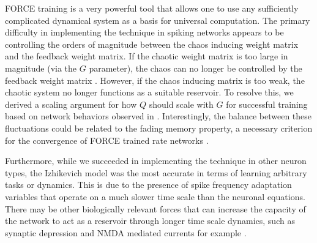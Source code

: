 \documentclass[11pt]{article} %
\begin{document}
%


FORCE training is a very powerful tool that allows one to use any sufficiently complicated dynamical system as a basis for universal computation.   The primary difficulty in implementing the technique in spiking networks appears to be controlling the orders of magnitude between the chaos inducing weight matrix and the feedback weight matrix.  If the chaotic weight matrix is too large in magnitude (via the $G$ parameter), the chaos can no longer be controlled by the feedback weight matrix \cite{FORCE1}.  However, if the chaos inducing matrix is too weak, the chaotic system no longer functions as a suitable reservoir.   To resolve this, we derived a scaling argument for how $Q$ should scale with $G$ for successful training based on network behaviors observed in \cite{FORCE1}.  Interestingly, the balance between these fluctuations could be related to the fading memory property, a necessary criterion for the convergence of FORCE trained rate networks \cite{rivkind}.

Furthermore, while we succeeded in implementing the technique in other neuron types, the Izhikevich model was the most accurate in terms of learning arbitrary tasks or dynamics.  This is due to the presence of spike frequency adaptation variables that operate on a much slower time scale than the neuronal equations.  There may be other biologically relevant forces that can increase the capacity of the network to act as a reservoir through longer time scale dynamics, such as synaptic depression and NMDA mediated currents for example \cite{tsodyks,Nmaass1,Nmaass2}. 
\end{document}
